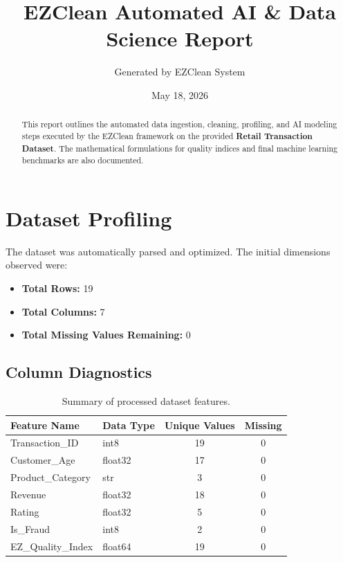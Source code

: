 \documentclass[12pt,a4paper]{article}
\title{\textbf{EZClean Automated AI \& Data Science Report}}
\author{Generated by EZClean System}
\date{May 18, 2026}
\begin{document}
\maketitle

\begin{abstract}
This report outlines the automated data ingestion, cleaning, profiling, and AI modeling steps executed by the EZClean framework on the provided \textbf{Retail Transaction Dataset}. The mathematical formulations for quality indices and final machine learning benchmarks are also documented.
\end{abstract}

\section{Dataset Profiling}
The dataset was automatically parsed and optimized. The initial dimensions observed were:
\begin{itemize}
    \item \textbf{Total Rows:} 19
    \item \textbf{Total Columns:} 7
    \item \textbf{Total Missing Values Remaining:} 0
\end{itemize}

\subsection{Column Diagnostics}
\begin{table}[h!]
    \centering
    \begin{tabular}{|l|l|c|c|}
        \hline
        \textbf{Feature Name} & \textbf{Data Type} & \textbf{Unique Values} & \textbf{Missing} \\
        \hline
            Transaction\_ID & int8 & 19 & 0 \\
            \hline
            Customer\_Age & float32 & 17 & 0 \\
            \hline
            Product\_Category & str & 3 & 0 \\
            \hline
            Revenue & float32 & 18 & 0 \\
            \hline
            Rating & float32 & 5 & 0 \\
            \hline
            Is\_Fraud & int8 & 2 & 0 \\
            \hline
            EZ\_Quality\_Index & float64 & 19 & 0 \\
            \hline
    \end{tabular}
    \caption{Summary of processed dataset features.}
\end{table}
\end{document}
